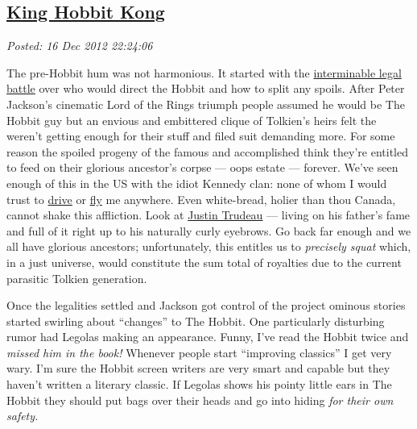%

\subsection*{\href{http://bakerjd99.wordpress.com/2012/12/16/king-hobbit-kong/}{King Hobbit Kong}}


\noindent\emph{Posted: 16 Dec 2012 22:24:06}
\vspace{6pt}

The pre-Hobbit hum was not harmonious. It started with the
\href{http://www.nydailynews.com/blogs/pageviews/2012/11/law-of-the-rings-producers-of-the-hobbit-face-epic-legal-battle-alongside-world-pr}{interminable
legal battle} over who would direct the Hobbit and how to split any
spoils. After Peter Jackson's cinematic Lord of the Rings triumph people
assumed he would be The Hobbit guy but an envious and embittered clique
of Tolkien's heirs felt the weren't getting enough for their stuff and
filed suit demanding more. For some reason the spoiled progeny of the
famous and accomplished think they're entitled to feed on their glorious
ancestor's corpse --- oops estate --- forever. We've seen enough of this
in the US with the idiot Kennedy clan: none of whom I would trust to
\href{http://www.washingtonpost.com/wp-srv/politics/special/clinton/frenzy/kennedy.htm}{drive}
or
\href{http://articles.cnn.com/1999-07-21/us/9907\_21\_kennedy.plane.06\_1\_wreckage-piper-saratoga-ii-body?\_s=PM:US}{fly}
me anywhere. Even white-bread, holier than thou Canada, cannot shake
this affliction. Look at
\href{http://www.cbc.ca/news/politics/story/2012/12/03/pol-trudeau-gun-registry-failed-policy.html}{Justin
Trudeau} --- living on his father's fame and full of it right up to his
naturally curly eyebrows. Go back far enough and we all have glorious
ancestors; unfortunately, this entitles us to \emph{precisely squat}
which, in a just universe, would constitute the sum total of royalties
due to the current parasitic Tolkien generation.

Once the legalities settled and Jackson got control of the project
ominous stories started swirling about ``changes'' to The Hobbit. One
particularly disturbing rumor had Legolas making an appearance. Funny,
I've read the Hobbit twice and \emph{missed him in the book!} Whenever
people start ``improving classics'' I get very wary. I'm sure the Hobbit
screen writers are very smart and capable but they haven't written a
literary classic. If Legolas shows his pointy little ears in The Hobbit
they should put bags over their heads and go into hiding \emph{for their
own safety.}

